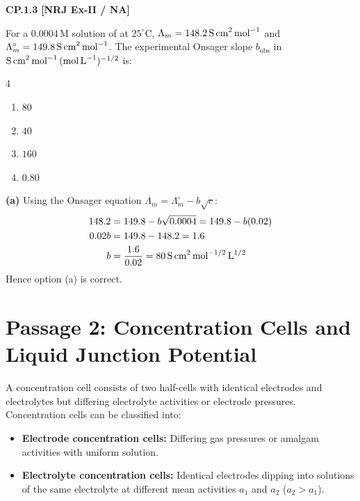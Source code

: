 \begin{problembox}
\textbf{CP.1.3} \hfill \textbf{[NRJ Ex-II / NA]}

For a $0.0004\,\text{M}$ solution of  at $25^\circ\text{C}$, $\Lambda_m = 148.2\,\text{S\,cm}^2\,\text{mol}^{-1}$ and $\Lambda_m^\circ = 149.8\,\text{S\,cm}^2\,\text{mol}^{-1}$. The experimental Onsager slope $b_{\text{obs}}$ in $\text{S\,cm}^2\,\text{mol}^{-1}\,(\text{mol\,L}^{-1})^{-1/2}$ is:
\begin{multicols}{4}
\begin{enumerate}[label=(\alph*)]
    \item $80$
    \item $40$
    \item $160$
    \item $0.80$
\end{enumerate}
\end{multicols}
\end{problembox}
\begin{solution}
\textbf{(a)}
Using the Onsager equation $\Lambda_m = \Lambda_m^\circ - b\sqrt{c}$:
\begin{align*}
    148.2 &= 149.8 - b\sqrt{0.0004} = 149.8 - b(0.02) \\
    0.02 b &= 149.8 - 148.2 = 1.6 \\
    b &= \frac{1.6}{0.02} = 80\,\text{S\,cm}^2\,\text{mol}^{-1/2}\,\text{L}^{1/2}
\end{align*}
Hence option (a) is correct.
\end{solution}

\vspace{0.5cm}
\section*{Passage 2: Concentration Cells and Liquid Junction Potential}

A concentration cell consists of two half-cells with identical electrodes and electrolytes but differing electrolyte activities or electrode pressures. Concentration cells can be classified into:
\begin{itemize}
    \item \textbf{Electrode concentration cells:} Differing gas pressures or amalgam activities with uniform solution.
    \item \textbf{Electrolyte concentration cells:} Identical electrodes dipping into solutions of the same electrolyte at different mean activities $a_1$ and $a_2$ ($a_2 > a_1$).
\end{itemize}

